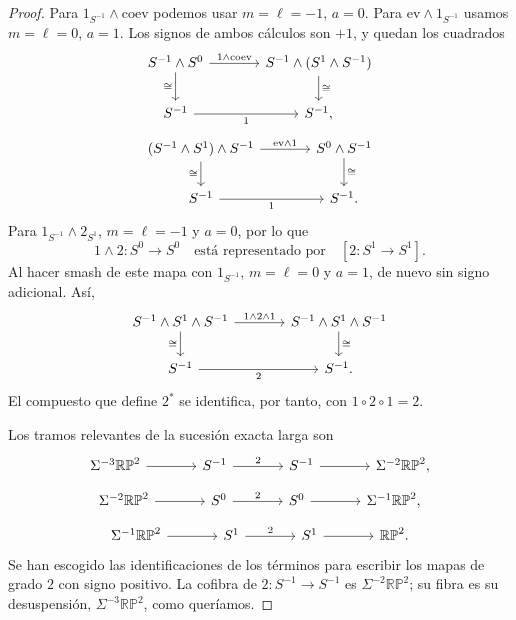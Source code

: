 \begin{proof}
Para $1_{S^{-1}}\wedge\mathrm{coev}$ podemos usar $m=\ell=-1$, $a=0$. Para $\mathrm{ev}\wedge1_{S^{-1}}$ usamos $m=\ell=0$, $a=1$. Los signos de ambos cálculos son $+1$, y quedan los cuadrados
\[
\begin{tikzcd}[column sep=large]
S^{-1}\wedge S^0 \arrow[r,"1\wedge\mathrm{coev}"] \arrow[d,"\cong"'] & S^{-1}\wedge(S^1\wedge S^{-1}) \arrow[d,"\cong"]\\
S^{-1} \arrow[r,"1"'] & S^{-1},
\end{tikzcd}
\]
\[
\begin{tikzcd}[column sep=large]
(S^{-1}\wedge S^1)\wedge S^{-1} \arrow[r,"\mathrm{ev}\wedge1"] \arrow[d,"\cong"'] & S^0\wedge S^{-1} \arrow[d,"\cong"]\\
S^{-1} \arrow[r,"1"'] & S^{-1}.
\end{tikzcd}
\]
Para $1_{S^{-1}}\wedge2_{S^1}$, $m=\ell=-1$ y $a=0$, por lo que
\[
1\wedge2\colon S^0\to S^0
\quad\text{está representado por}\quad [2\colon S^1\to S^1].
\]
Al hacer smash de este mapa con $1_{S^{-1}}$, $m=\ell=0$ y $a=1$, de nuevo sin signo adicional. Así,
\[
\begin{tikzcd}[column sep=large]
S^{-1}\wedge S^1\wedge S^{-1} \arrow[r,"1\wedge2\wedge1"] \arrow[d,"\cong"'] & S^{-1}\wedge S^1\wedge S^{-1} \arrow[d,"\cong"]\\
S^{-1} \arrow[r,"2"'] & S^{-1}.
\end{tikzcd}
\]
El compuesto que define $2^*$ se identifica, por tanto, con $1\circ2\circ1=2$.

Los tramos relevantes de la sucesión exacta larga son
\[
\begin{tikzcd}[column sep=large]
\Sigma^{-3}\mathbb{RP}^2 \arrow[r] & S^{-1} \arrow[r,"2"] & S^{-1} \arrow[r] & \Sigma^{-2}\mathbb{RP}^2,
\end{tikzcd}
\]
\[
\begin{tikzcd}[column sep=large]
\Sigma^{-2}\mathbb{RP}^2 \arrow[r] & S^0 \arrow[r,"2"] & S^0 \arrow[r] & \Sigma^{-1}\mathbb{RP}^2,
\end{tikzcd}
\]
\[
\begin{tikzcd}[column sep=large]
\Sigma^{-1}\mathbb{RP}^2 \arrow[r] & S^1 \arrow[r,"2"] & S^1 \arrow[r] & \mathbb{RP}^2.
\end{tikzcd}
\]
Se han escogido las identificaciones de los términos para escribir los mapas de grado $2$ con signo positivo. La cofibra de $2\colon S^{-1}\to S^{-1}$ es $\Sigma^{-2}\mathbb{RP}^2$; su fibra es su desuspensión, $\Sigma^{-3}\mathbb{RP}^2$, como queríamos.
\end{proof}

